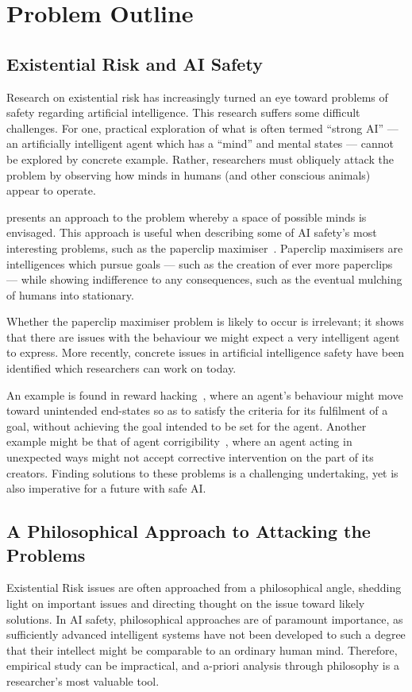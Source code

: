 \section{Problem Outline}
\subsection{Existential Risk and AI Safety}
Research on existential risk has increasingly turned an eye toward problems of safety regarding artificial intelligence. This research suffers some difficult challenges. For one, practical exploration of what is often termed ``strong AI'' --- an artificially intelligent agent which has a ``mind'' and mental states --- cannot be explored by concrete example. Rather, researchers must obliquely attack the problem by observing how minds in humans (and other conscious animals) appear to operate.\par

\cite{Sloman1984TheMinds} presents an approach to the problem whereby a space of possible minds is envisaged. This approach is useful when describing some of AI safety's most interesting problems, such as the paperclip maximiser~\citep{bostrom2003ethical}. Paperclip maximisers are intelligences which pursue goals --- such as the creation of ever more paperclips --- while showing indifference to any consequences, such as the eventual mulching of humans into stationary.\par

Whether the paperclip maximiser problem is likely to occur is irrelevant; it shows that there are issues with the behaviour we might expect a very intelligent agent to express. More recently, concrete issues in artificial intelligence safety have been identified which researchers can work on today.\par

An example is found in reward hacking~\citep{concrete_problems}, where an agent's behaviour might move toward unintended end-states so as to satisfy the criteria for its fulfilment of a goal, without achieving the goal intended to be set for the agent. Another example might be that of agent corrigibility~\citep{corrigibility}, where an agent acting in unexpected ways might not accept corrective intervention on the part of its creators. Finding solutions to these problems is a challenging undertaking, yet is also imperative for a future with safe AI.\par

\subsection{A Philosophical Approach to Attacking the Problems}
Existential Risk issues are often approached from a philosophical angle, shedding light on important issues and directing thought on the issue toward likely solutions. In AI safety, philosophical approaches are of paramount importance, as sufficiently advanced intelligent systems have not been developed to such a degree that their intellect might be comparable to an ordinary human mind. Therefore, empirical study can be impractical, and a-priori analysis through philosophy is a researcher's most valuable tool.\par

